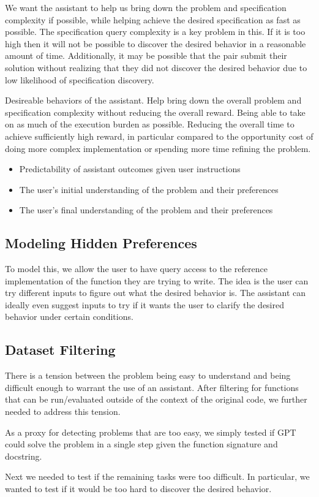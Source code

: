 \documentclass{article}
\begin{document}
We want the assistant to help us bring down the problem and specification complexity if possible, while helping achieve the desired specification as fast as possible. The specification query complexity is a key problem in this. If it is too high then it will not be possible to discover the desired behavior in a reasonable amount of time. Additionally, it may be possible that the pair submit their solution without realizing that they did not discover the desired behavior due to low likelihood of specification discovery.

Desireable behaviors of the assistant. Help bring down the overall problem and specification complexity without reducing the overall reward. Being able to take on as much of the execution burden as possible. Reducing the overall time to achieve sufficiently high reward, in particular compared to the opportunity cost of doing more complex implementation or spending more time refining the problem.
\begin{itemize}
    \item Predictability of assistant outcomes given user instructions
    \item The user's initial understanding of the problem and their preferences
    \item The user's final understanding of the problem and their preferences
\end{itemize}

\subsection{Modeling Hidden Preferences}
To model this, we allow the user to have query access to the reference implementation of the function they are trying to write. The idea is the user can try different inputs to figure out what the desired behavior is. The assistant can ideally even suggest inputs to try if it wants the user to clarify the desired behavior under certain conditions.

\subsection{Dataset Filtering}
There is a tension between the problem being easy to understand and being difficult enough to warrant the use of an assistant. After filtering for functions that can be run/evaluated outside of the context of the original code, we further needed to address this tension.

As a proxy for detecting problems that are too easy, we simply tested if GPT could solve the problem in a single step given the function signature and docstring. 

Next we needed to test if the remaining tasks were too difficult. In particular, we wanted to test if it would be too hard to discover the desired behavior.


\printbibliography
\end{document}
